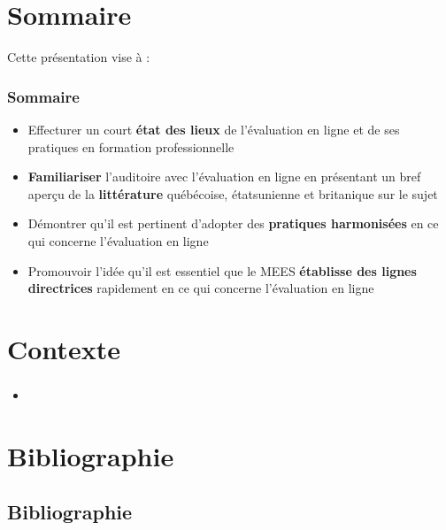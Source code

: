 	
	
	\frame{\titlepage} 
	\usebackgroundtemplate{ } 
	\section{Sommaire} 
		\begin{frame}
			Cette présentation vise à :
			\frametitle{Sommaire}
			\begin {itemize}
				\item Effecturer un court \textbf{état des lieux} de l'évaluation en ligne et de ses pratiques en formation professionnelle
				\item \textbf{Familiariser} l'auditoire avec l'évaluation en ligne en présentant un bref aperçu de la \textbf{littérature} québécoise, étatsunienne et britanique sur le sujet
				\item Démontrer qu'il est pertinent d'adopter des \textbf{pratiques harmonisées} en ce qui concerne l'évaluation en ligne
				\item Promouvoir l'idée qu'il est essentiel que le MEES \textbf{établisse des lignes directrices} rapidement en ce qui concerne l'évaluation en ligne

			\end{itemize}
		\end{frame}


	\section{Contexte} 
		\begin{frame}[allowframebreaks]
			\frametitle{}
			\begin {itemize}
				\item 
			\end{itemize}
		\end{frame}
		
		


\section{Bibliographie}
\subsection{Bibliographie}



